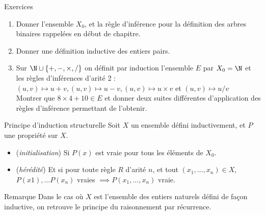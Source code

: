 \documentclass[10pt]{beamer}
\begin{document}
\begin{frame}[fragile]{\Ctitle}{\stitle}
    \begin{exampleblock}{Exercices}
        \begin{enumerate}
            \item<1-> Donner l'ensemble $X_0$, et la règle d'inférence pour la définition des arbres binaires rappelées en début de chapitre.
            \item<2-> Donner une définition inductive des entiers pairs.
            \item<3-> Sur $\N \cup \{+, -, \times, /\}$ on définit par induction l'ensemble $E$ par $X_0 = \N$ et les règles d'inférences d'arité 2 : 
                $(u,v) \mapsto u + v, (u,v) \mapsto u - v, (u,v) \mapsto u \times v$ et $(u,v) \mapsto u / v$ \\
                Montrer que $8 \times 4 + 10 \in E$ et donner deux suites différentes d'application des règles d'inférence permettant de l'obtenir.
        \end{enumerate}
    \end{exampleblock}
\end{frame}

\begin{frame}[fragile]{\Ctitle}{\stitle}
    \begin{alertblock}{Principe d'induction structurelle}
        Soit $X$ un ensemble défini inductivement, et $P$ une propriété sur $X$.
        \begin{itemize}
            \item<2-> (\textit{initialisation}) Si $P(x)$ est vraie pour tous les éléments de $X_0$.
            \item<3-> (\textit{hérédité}) Et si pour toute règle $R$ d'arité $n$, et tout $(x_1,\dots,x_n) \in X$, $P(x1), \dots P(x_n)$ vraies $\implies P(x_1,\dots,x_n)$ vraie.
        \end{itemize}
    \end{alertblock}
    {\begin{block}{Remarque}
        Dans le cas où $X$ est l'ensemble des entiers naturels défini de façon inductive, on retrouve le principe du raisonnement par récurrence.
    \end{block}}
\end{frame}
\end{document}
